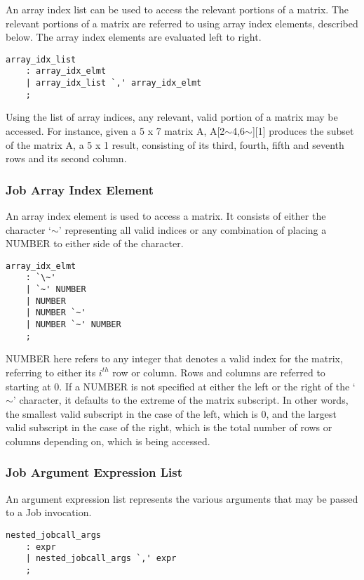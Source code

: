 \documentclass[prodmode,acmtecs]{acmsmall}
\begin{document}
An array index list can be used to access the relevant portions of a matrix. 
The relevant portions of a matrix are referred to using array index elements, 
described below. The array index elements are evaluated left to right.

\begin{lstlisting}
array_idx_list
	: array_idx_elmt
	| array_idx_list `,' array_idx_elmt
	;
\end{lstlisting}

Using the list of array indices, any relevant, valid portion of a matrix may
be accessed. For instance, given a 5 x 7 matrix A, A[2$\sim$4,6$\sim$][1] produces the
subset of the matrix A, a 5 x 1 result, consisting of its third, fourth, 
fifth and seventh rows and its second column.
\medskip

\subsubsection{Job Array Index Element}

An array index element is used to access a matrix. It consists of either 
the character `$\sim$' representing all valid indices or any combination of placing
a NUMBER to either side of the character. 

\begin{lstlisting}
array_idx_elmt
	: `\~'
	| `~' NUMBER
	| NUMBER
	| NUMBER `~'
	| NUMBER `~' NUMBER
	;
\end{lstlisting}

NUMBER here refers to any integer that denotes a valid index for the 
matrix, referring to either its $i^{th}$ row or column. Rows and columns are 
referred to starting at 0. If a NUMBER is not specified at either 
the left or the right of the `$\sim$' character, it defaults to the extreme 
of the matrix subscript. In other words, the smallest valid subscript in 
the case of the left, which is 0, and the largest valid subscript in the 
case of the right, which is the total number of rows or columns depending
on, which is being accessed.
\medskip

\subsubsection{Job Argument Expression List}

An argument expression list represents the various arguments that may be
passed to a Job invocation. 

\begin{lstlisting}
nested_jobcall_args
	: expr
	| nested_jobcall_args `,' expr
	;
\end{lstlisting}
\end{document}

